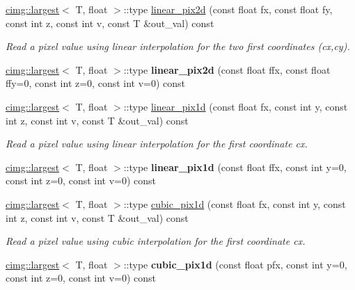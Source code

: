 \begin{DoxyCompactItemize}
\item 
\hyperlink{structcimg__library_1_1cimg_1_1largest}{cimg::largest}$<$ T, float $>$::type \hyperlink{structcimg__library_1_1_c_img_aef4529ff9352c692ad156b889ed2467e}{linear\_\-pix2d} (const float fx, const float fy, const int z, const int v, const T \&out\_\-val) const 
\begin{DoxyCompactList}\small\item\em Read a pixel value using linear interpolation for the two first coordinates ({\ttfamily cx},{\ttfamily cy}). \item\end{DoxyCompactList}\item 
\hypertarget{structcimg__library_1_1_c_img_a9a2dca373da881d433796991a7ff9646}{
\hyperlink{structcimg__library_1_1cimg_1_1largest}{cimg::largest}$<$ T, float $>$::type {\bfseries linear\_\-pix2d} (const float ffx, const float ffy=0, const int z=0, const int v=0) const }
\label{structcimg__library_1_1_c_img_a9a2dca373da881d433796991a7ff9646}

\item 
\hyperlink{structcimg__library_1_1cimg_1_1largest}{cimg::largest}$<$ T, float $>$::type \hyperlink{structcimg__library_1_1_c_img_aa15ba9c9b711964f50f326991e47040f}{linear\_\-pix1d} (const float fx, const int y, const int z, const int v, const T \&out\_\-val) const 
\begin{DoxyCompactList}\small\item\em Read a pixel value using linear interpolation for the first coordinate {\ttfamily cx}. \item\end{DoxyCompactList}\item 
\hypertarget{structcimg__library_1_1_c_img_ab142001b5fa67ef28d33e48c226cc266}{
\hyperlink{structcimg__library_1_1cimg_1_1largest}{cimg::largest}$<$ T, float $>$::type {\bfseries linear\_\-pix1d} (const float ffx, const int y=0, const int z=0, const int v=0) const }
\label{structcimg__library_1_1_c_img_ab142001b5fa67ef28d33e48c226cc266}

\item 
\hyperlink{structcimg__library_1_1cimg_1_1largest}{cimg::largest}$<$ T, float $>$::type \hyperlink{structcimg__library_1_1_c_img_abd46668b4c8326f5bc0c4b6e73c71dd9}{cubic\_\-pix1d} (const float fx, const int y, const int z, const int v, const T \&out\_\-val) const 
\begin{DoxyCompactList}\small\item\em Read a pixel value using cubic interpolation for the first coordinate {\ttfamily cx}. \item\end{DoxyCompactList}\item 
\hypertarget{structcimg__library_1_1_c_img_a6963a32c1b2e24c81d3ef7a0c8512460}{
\hyperlink{structcimg__library_1_1cimg_1_1largest}{cimg::largest}$<$ T, float $>$::type {\bfseries cubic\_\-pix1d} (const float pfx, const int y=0, const int z=0, const int v=0) const }
\label{structcimg__library_1_1_c_img_a6963a32c1b2e24c81d3ef7a0c8512460}


\end{DoxyCompactItemize}
